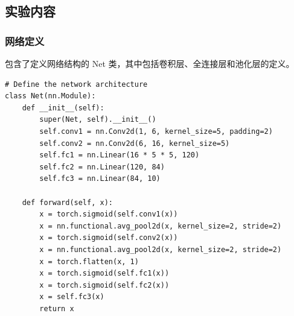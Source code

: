 \documentclass[a4paper,12pt]{article}
\begin{document}
\subsection{实验内容}
\subsubsection{网络定义}
包含了定义网络结构的 Net 类，其中包括卷积层、全连接层和池化层的定义。
\begin{lstlisting}
# Define the network architecture
class Net(nn.Module):
    def __init__(self):
        super(Net, self).__init__()
        self.conv1 = nn.Conv2d(1, 6, kernel_size=5, padding=2)
        self.conv2 = nn.Conv2d(6, 16, kernel_size=5)
        self.fc1 = nn.Linear(16 * 5 * 5, 120)
        self.fc2 = nn.Linear(120, 84)
        self.fc3 = nn.Linear(84, 10)

    def forward(self, x):
        x = torch.sigmoid(self.conv1(x))
        x = nn.functional.avg_pool2d(x, kernel_size=2, stride=2)
        x = torch.sigmoid(self.conv2(x))
        x = nn.functional.avg_pool2d(x, kernel_size=2, stride=2)
        x = torch.flatten(x, 1)
        x = torch.sigmoid(self.fc1(x))
        x = torch.sigmoid(self.fc2(x))
        x = self.fc3(x)
        return x

\end{lstlisting}
\end{document}
